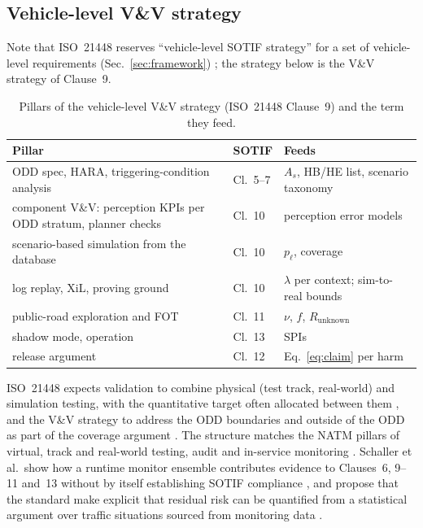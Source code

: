 \documentclass[11pt,a4paper]{article}
\begin{document}
\subsection{Vehicle-level V\&V strategy}
Note that ISO~21448 reserves ``vehicle-level SOTIF strategy'' for a set of vehicle-level requirements (Sec.~\ref{sec:framework}) \cite[3.34, p.~10]{iso21448}; the strategy below is the V\&V strategy of Clause~9.
\begin{table}[H]\centering\small
\caption{Pillars of the vehicle-level V\&V strategy (ISO~21448 Clause~9) and the term they feed.}
\begin{tabular}{L{5.4cm}L{2.4cm}L{6.4cm}}
\toprule
Pillar & SOTIF & Feeds\\\midrule
ODD spec, HARA, triggering-condition analysis & Cl.~5--7 & $A_s$, HB/HE list, scenario taxonomy\\
component V\&V: perception KPIs per ODD stratum, planner checks & Cl.~10 & perception error models\\
scenario-based simulation from the database & Cl.~10 & $p_\ell$, coverage \cite[Sec.~6.2, pp.~16--17]{schaller2026}\\
log replay, XiL, proving ground & Cl.~10 & $\lambda$ per context; sim-to-real bounds\\
public-road exploration and FOT & Cl.~11 & $\nu$, $f$, $R_{\text{unknown}}$ \cite[Sec.~6.3, p.~17]{schaller2026}\\
shadow mode, operation & Cl.~13 & SPIs \cite[Sec.~7, p.~18]{schaller2026}\\
release argument & Cl.~12 & Eq.~\eqref{eq:claim} per harm\\
\bottomrule
\end{tabular}
\end{table}
ISO~21448 expects validation to combine physical (test track, real-world) and simulation testing, with the quantitative target often allocated between them \cite[C.1, p.~125]{iso21448}, and the V\&V strategy to address the ODD boundaries and outside of the ODD as part of the coverage argument \cite[9.2 and Note, p.~43]{iso21448}. The structure matches the NATM pillars of virtual, track and real-world testing, audit and in-service monitoring \cite[web article]{siemensnatm}. Schaller et al.\ show how a runtime monitor ensemble contributes evidence to Clauses~6, 9--11 and~13 without by itself establishing SOTIF compliance \cite[Sec.~1.2, p.~3; Secs.~5--7, pp.~14--18]{schaller2026}, and propose that the standard make explicit that residual risk can be quantified from a statistical argument over traffic situations sourced from monitoring data \cite[Sec.~8.2, p.~19]{schaller2026}.
\end{document}
